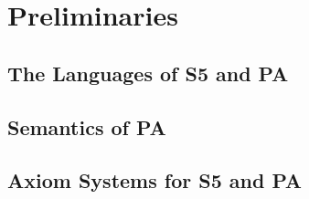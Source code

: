 \chapter{Preliminaries}\label{ch:preliminaries}

\section{The Languages of S5 and PA}\label{sec:languages}

\section{Semantics of PA}\label{sec:semantics}

\section{Axiom Systems for S5 and PA}\label{sec:axioms}
